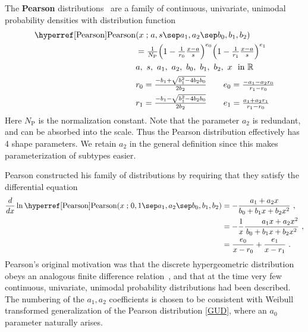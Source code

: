 

\label{sec:Pearson}
{} 
The {\bf Pearson} distributions~\cite{Pearson1895, Pearson1901, Pearson1916, Ord1972, Johnson1994} are a family of continuous, univariate, unimodal probability densities with distribution function
\begin{align}
\label{Pearson}
 \opr{Pearson}&(x\given a, s\sep a_1, a_2\sep  b_0, b_1, b_2) 
 \\ \notag
 &=  \tfrac{1}{N_{\text{P}}} \Left(1- \tfrac{1}{r_0}\tfrac{x-a}{s} \Right)^{e_0} \Left(1- \tfrac{1}{r_1}\tfrac{x-a}{s} \Right)^{e_1}
\\ \notag
&  a,\ s,\  a_1,\ a_2,\ b_0,\ b_1,\ b_2,\ x\  \text{ in } \mathbb{R}
\\ \notag
& r_0 = \tfrac{-b_1+\sqrt{b_1^2 - 4b_2b_0} }{2b_2} \checked  \qquad e_0 = \tfrac{-a_1-a_2 r_0}{r_1-r_0} \\
\notag
& r_1 = \tfrac{-b_1-\sqrt{b_1^2 - 4b_2b_0} }{2b_2} \checked \qquad e_1 = \tfrac{a_1+a_2 r_1}{r_1-r_0} 
\end{align}
Here $N_{\text{P}}$ is the normalization constant. Note that the parameter $a_2$  is redundant, and can be absorbed into the scale. Thus the Pearson distribution effectively has 4 shape parameters. We retain $a_2$ in the general definition since this makes parameterization of subtypes easier. 


Pearson constructed his family of distributions by requiring that they satisfy the differential equation
\begin{align*}
\frac{d}{dx} \ln  \opr{Pearson}(x\given 0, 1\sep a_1, a_2\sep b_0, b_1, b_2) 
&= - \frac{a_1 + a_2 x  }{b_0+ b_1 x+ b_2 x^2  } \ ,  \checked \\
&= - \frac{1}{x} \frac{\phantom{a_0 + {} } a_1 x + a_2 x^2  }{b_0+ b_1 x+ b_2 x^2  } \ ,  \checked \\
&= \frac{e_0}{x-r_0} + \frac{e_1}{x-r_1} \ . \checked
\end{align*}
Pearson's original motivation was that the discrete hypergeometric distribution obeys an analogous finite difference relation~\cite{Ord1972}, and that at the time very few continuous, univariate, unimodal probability distributions had been described. The numbering of the $a_1, a_2$ coefficients is chosen to be consistent with Weibull transformed generalization of the Pearson distribution \eqref{GUD}, where an $a_0$ parameter naturally arises. 


